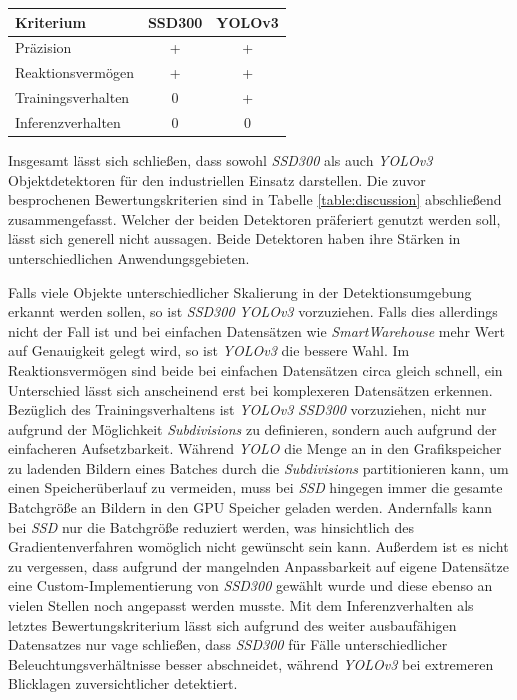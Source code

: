 \begin{center}
	\begin{tabular}[h]{l|c|c}
		Kriterium & SSD300 & YOLOv3 \\
		\hline
		Präzision & + & + \\
		Reaktionsvermögen & + & + \\
		Trainingsverhalten & 0 & + \\
		Inferenzverhalten & 0 & 0 \\
	\end{tabular}
	\label{table:discussion}
\end{center}

Insgesamt lässt sich schließen, dass sowohl \textit{SSD300} als auch \textit{YOLOv3} Objektdetektoren für den industriellen Einsatz darstellen. Die zuvor besprochenen Bewertungskriterien sind in Tabelle \ref{table:discussion} abschließend zusammengefasst. Welcher der beiden Detektoren präferiert genutzt werden soll, lässt sich generell nicht aussagen. Beide Detektoren haben ihre Stärken in unterschiedlichen Anwendungsgebieten. 

Falls viele Objekte unterschiedlicher Skalierung in der Detektionsumgebung erkannt werden sollen, so ist \textit{SSD300} \textit{YOLOv3} vorzuziehen. Falls dies allerdings nicht der Fall ist und bei einfachen Datensätzen wie \textit{SmartWarehouse} mehr Wert auf Genauigkeit gelegt wird, so ist \textit{YOLOv3} die bessere Wahl. Im Reaktionsvermögen sind beide bei einfachen Datensätzen circa gleich schnell, ein Unterschied lässt sich anscheinend erst bei komplexeren Datensätzen erkennen. Bezüglich des Trainingsverhaltens ist \textit{YOLOv3} \textit{SSD300} vorzuziehen, nicht nur aufgrund der Möglichkeit \textit{Subdivisions} zu definieren, sondern auch aufgrund der einfacheren Aufsetzbarkeit. Während \textit{YOLO} die Menge an in den Grafikspeicher zu ladenden Bildern eines Batches durch die \textit{Subdivisions} partitionieren kann, um einen Speicherüberlauf zu vermeiden, muss bei \textit{SSD} hingegen immer die gesamte Batchgröße an Bildern in den GPU Speicher geladen werden. Andernfalls kann bei \textit{SSD} nur die Batchgröße reduziert werden, was hinsichtlich des Gradientenverfahren womöglich nicht gewünscht sein kann. Außerdem ist es nicht zu vergessen, dass aufgrund der mangelnden Anpassbarkeit auf eigene Datensätze eine Custom-Implementierung von \textit{SSD300} gewählt wurde und diese ebenso an vielen Stellen noch angepasst werden musste. Mit dem Inferenzverhalten als letztes Bewertungskriterium lässt sich aufgrund des weiter ausbaufähigen Datensatzes nur vage schließen, dass \textit{SSD300} für Fälle unterschiedlicher Beleuchtungsverhältnisse besser abschneidet, während \textit{YOLOv3} bei extremeren Blicklagen zuversichtlicher detektiert. 

